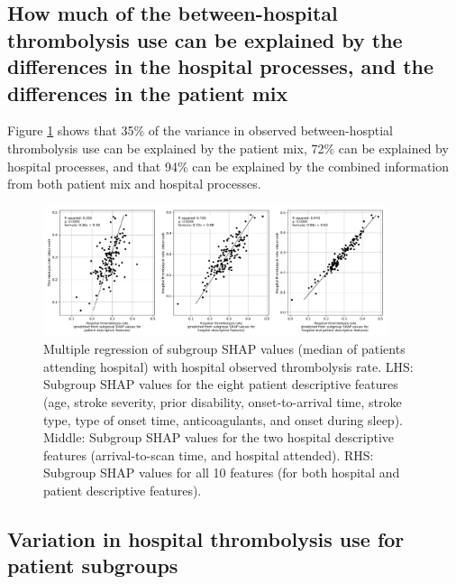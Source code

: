 \subsection{How much of the between-hospital thrombolysis use can be explained by the differences in the hospital processes, and the differences in the patient mix}%

Figure \ref{fig:shap_multiple_regression} shows that 35\% of the variance in observed between-hosptial thrombolysis use can be explained by the patient mix, 72\% can be explained by hospital processes, and that 94\% can be explained by the combined information from both patient mix and hospital processes. 


\begin{figure}[!h]
    \centering
    \includegraphics[width=0.9\textwidth]{./images/03e_xgb_10_features_multiple_regression_patient_hosptial}
    \caption{Multiple regression of subgroup SHAP values (median of patients attending hospital) with hospital observed thrombolysis rate. LHS: Subgroup SHAP values for the eight patient descriptive features (age, stroke severity, prior disability, onset-to-arrival time, stroke type, type of onset time, anticoagulants, and onset during sleep). Middle: Subgroup SHAP values for the two hospital descriptive features (arrival-to-scan time, and hospital attended). RHS: Subgroup SHAP values for all 10 features (for both hospital and patient descriptive features).}
  \label{fig:shap_multiple_regression}
\end{figure}

\subsection{Variation in hospital thrombolysis use for patient subgroups}

